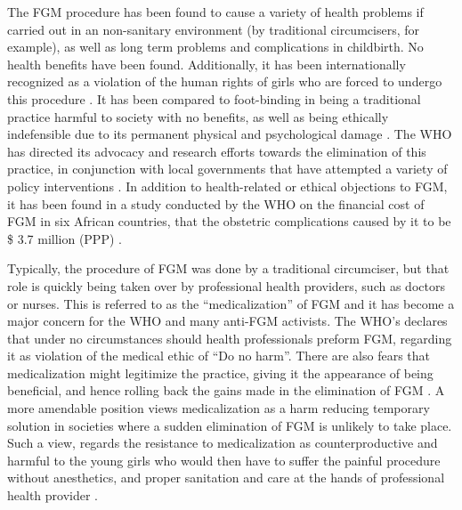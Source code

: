 \documentclass[12pt]{article}
\begin{document}
The FGM procedure has been found to cause a variety of health problems if carried out in an non-sanitary environment (by traditional circumcisers, for example), as well as long term problems and complications in childbirth.  No health benefits have been found. Additionally, it has been internationally recognized as a violation of the human rights of girls who are forced to undergo this procedure \citep{whofs241}. It has been compared to foot-binding in being a traditional practice harmful to society with no benefits, as well as being ethically indefensible due to its permanent physical and psychological damage \citep{Mackie1996}. The WHO has directed its advocacy and research efforts towards the elimination of this practice, in conjunction with local governments that have attempted a variety of policy interventions \citep{whofs241}. In addition to health-related or ethical objections to FGM, it has been found in a study conducted by the WHO on the financial cost of FGM in six African countries, that the obstetric complications caused by it to be \$ 3.7 million (PPP) \citep{Bishai2010}.

Typically, the procedure of FGM was done by a traditional circumciser, but that role is quickly being taken over by professional health providers, such as doctors or nurses.  This is referred to as the ``medicalization'' of FGM and it has become a major concern for the WHO and many anti-FGM activists. The WHO's declares that under no circumstances should health professionals preform FGM, regarding it as violation of the medical ethic of ``Do no harm''. There are also fears that medicalization might legitimize the practice, giving it the appearance of being beneficial, and hence rolling back the gains made in the elimination of FGM \citep{OHCHR}. A more amendable position views medicalization as a harm reducing temporary solution in societies where a sudden elimination of FGM is unlikely to take place.  Such a view, regards the resistance to medicalization as counterproductive and harmful to the young girls who would then have to suffer the painful procedure without anesthetics, and proper sanitation and care at the hands of professional health provider \citep{Shell-Duncan2001}. 
\end{document}
